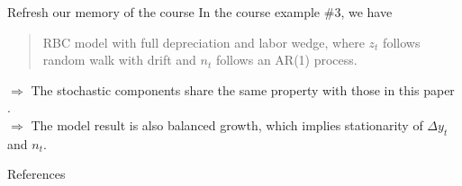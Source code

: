 \documentclass[10pt]{beamer}
\begin{document}
		      		\begin{frame}{Refresh our memory of the course}
		      			In the course example \#3, we have
		      			\begin{quote}
		      				RBC model with full depreciation and labor wedge, where $z_t$ follows random walk with drift and $n_t$ follows an AR(1) process.
		      			\end{quote}
		      			$\Longrightarrow$ The stochastic components share the same property with those in this paper \cite{cogley_nason_1995}.\\
		      			$\Longrightarrow$ The model result is also balanced growth, which implies stationarity of $\Delta y_t$ and $n_t$.
		      			
		      		\end{frame}
		      		
		      		\begin{frame}[allowframebreaks]{References}
		      			
		      			
		      			
		      			
		      		\end{frame}
		      		
\end{document}
